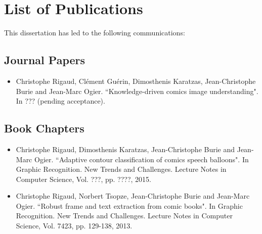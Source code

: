\chapter*{List of Publications}

This dissertation has led to the following communications:

\section*{Journal Papers}

\begin{itemize}

\item Christophe Rigaud, Cl{\'e}ment Gu{\'e}rin, Dimosthenis Karatzas, Jean-Christophe Burie and Jean-Marc Ogier. ``Knowledge-driven comics image understanding". In ??? (pending acceptance).
\vspace*{.3cm}

\vspace*{.3cm}

\end{itemize}

\section*{Book Chapters}

\begin{itemize}

\item Christophe Rigaud, Dimosthenis Karatzas, Jean-Christophe Burie and Jean-Marc Ogier. ``Adaptive contour classification of comics speech balloons". In Graphic Recognition. New Trends and Challenges. Lecture Notes in Computer Science, Vol. ???, pp. ????, 2015.
\vspace*{.3cm}

\item Christophe Rigaud, Norbert Tsopze, Jean-Christophe Burie and Jean-Marc Ogier. ``Robust frame and text extraction from comic books". In Graphic Recognition. New Trends and Challenges. Lecture Notes in Computer Science, Vol. 7423, pp. 129-138, 2013.
\vspace*{.3cm}

\end{itemize}

